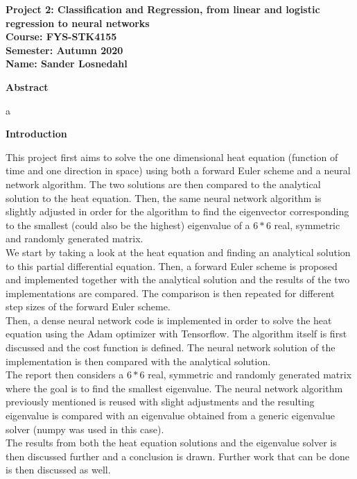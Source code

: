 \documentclass[12pt,a4paper]{article}
\begin{document}
\begin{center}
\LARGE{\textbf{Project 2: Classification and Regression, from linear and logistic regression to neural networks}}
\\
\large{\textbf{Course: FYS-STK4155}}
\\
\large{\textbf{Semester: Autumn 2020}}
\\
\large{\textbf{Name: Sander Losnedahl}}
\end{center}

\begin{center}
\Large{\textbf{Abstract}}
\end{center}

\noindent a

\newpage

\begin{center}
\Large{\textbf{Introduction}}
\end{center}

\noindent This project first aims to solve the one dimensional heat equation (function of time and one direction in space) using both a forward Euler scheme and a neural network algorithm. The two solutions are then compared to the analytical solution to the heat equation. Then, the same neural network algorithm is slightly adjusted in order for the algorithm to find the eigenvector corresponding to the smallest (could also be the highest) eigenvalue of a $6*6$ real, symmetric and randomly generated matrix.
\\
We start by taking a look at the heat equation and finding an analytical solution to this partial differential equation. Then, a forward Euler scheme is proposed and implemented together with the analytical solution and the results of the two implementations are compared. The comparison is then repeated for different step sizes of the forward Euler scheme.
\\
Then, a dense neural network code is implemented in order to solve the heat equation using the Adam optimizer with Tensorflow. The algorithm itself is first discussed and the cost function is defined. The neural network solution of the implementation is then compared with the analytical solution.
\\
The report then considers a $6*6$ real, symmetric and randomly generated matrix where the goal is to find the smallest eigenvalue. The neural network algorithm previously mentioned is reused with slight adjustments and the resulting eigenvalue is compared with an eigenvalue obtained from a generic eigenvalue solver (numpy was used in this case).
\\
The results from both the heat equation solutions and the eigenvalue solver is then discussed further and a conclusion is drawn. Further work that can be done is then discussed as well. 
\end{document}
